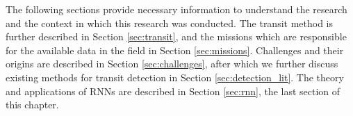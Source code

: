 
The following sections provide necessary information to understand the research and the context in which this research was conducted. The transit method is further described in Section \ref{sec:transit}, and the missions which are responsible for the available data in the field in Section \ref{sec:missions}. Challenges and their origins are described in Section \ref{sec:challenges}, after which we further discuss existing methods for transit detection in Section \ref{sec:detection_lit}. The theory and applications of RNNs are described in Section \ref{sec:rnn}, the last section of this chapter.